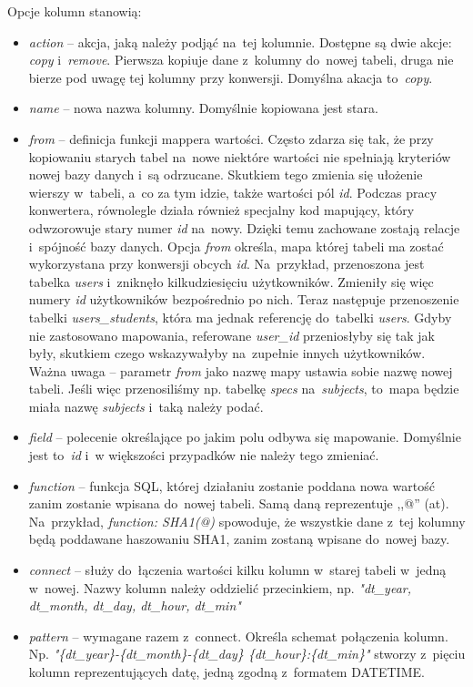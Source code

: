 \documentclass[a4paper,12pt,oneside]{report}
\begin{document}
Opcje kolumn stanowią:
\begin{itemize}
  \item \emph{action} -- akcja, jaką należy podjąć na~tej kolumnie. Dostępne są dwie akcje: \emph{copy} i~\emph{remove}. Pierwsza kopiuje dane z~kolumny do~nowej tabeli, druga nie bierze pod uwagę tej kolumny przy konwersji. Domyślna akacja to~\emph{copy}.
  \item \emph{name} -- nowa nazwa kolumny. Domyślnie kopiowana jest stara.
  \item \emph{from} -- definicja funkcji mappera wartości. Często zdarza się tak, że przy kopiowaniu starych tabel na~nowe niektóre wartości nie spełniają kryteriów nowej bazy danych i~są odrzucane. Skutkiem tego zmienia się ułożenie wierszy w~tabeli, a~co za tym idzie, także wartości pól \emph{id}. Podczas pracy konwertera, równolegle działa również specjalny kod mapujący, który odwzorowuje stary numer \emph{id} na~nowy. Dzięki temu zachowane zostają relacje i~spójność bazy danych. Opcja \emph{from} określa, mapa której tabeli ma zostać wykorzystana przy konwersji obcych \emph{id}. Na~przykład, przenoszona jest tabelka \emph{users} i~zniknęło kilkudziesięciu użytkowników. Zmieniły się więc numery \emph{id} użytkowników bezpośrednio po nich. Teraz następuje przenoszenie tabelki \emph{users\_students}, która ma jednak referencję do~tabelki \emph{users}. Gdyby nie zastosowano mapowania, referowane \emph{user\_id} przeniosłyby się tak jak były, skutkiem czego wskazywałyby na~zupełnie innych użytkowników. Ważna uwaga -- parametr \emph{from} jako nazwę mapy ustawia sobie nazwę nowej tabeli. Jeśli więc przenosiliśmy np. tabelkę \emph{specs} na~\emph{subjects}, to~mapa będzie miała nazwę \emph{subjects} i~taką należy podać.
  \item \emph{field} -- polecenie określające po jakim polu odbywa się mapowanie. Domyślnie jest to~\emph{id} i~w większości przypadków nie należy tego zmieniać.
  \item \emph{function} -- funkcja SQL, której działaniu zostanie poddana nowa wartość zanim zostanie wpisana do~nowej tabeli. Samą daną reprezentuje ,,@'' (at). Na~przykład, \emph{function: SHA1(@)} spowoduje, że wszystkie dane z~tej kolumny będą poddawane haszowaniu SHA1, zanim zostaną wpisane do~nowej bazy.
  \item \emph{connect} -- służy do~łączenia wartości kilku kolumn w~starej tabeli w~jedną w~nowej. Nazwy kolumn należy oddzielić przecinkiem, np. \emph{"dt\_year, dt\_month, dt\_day, dt\_hour, dt\_min"}
  \item \emph{pattern} -- wymagane razem z~connect. Określa schemat połączenia kolumn. Np. \emph{"\{dt\_year\}-\{dt\_month\}-\{dt\_day\} \{dt\_hour\}:\{dt\_min\}"} stworzy z~pięciu kolumn reprezentujących datę, jedną zgodną z~formatem DATETIME.
\end{itemize}
\end{document}
